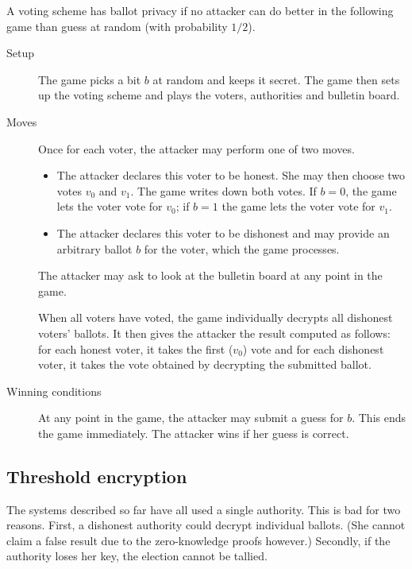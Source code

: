 \documentclass{llncs}
\begin{document}
\begin{definition}
A voting scheme has ballot privacy if no attacker can do better in the following
game than guess at random (with probability $1/2$).

\begin{description}
\item[Setup] The game picks a bit $b$ at random and keeps it secret. The game
then sets up the voting scheme and plays the voters, authorities and bulletin
board.

\item[Moves] Once for each voter, the attacker may perform one of two moves.
\begin{itemize}
\item The attacker declares this voter to be honest. She may then choose two votes $v_0$ and
$v_1$. The game writes down both votes. If $b = 0$, the game lets the voter vote
for $v_0$; if $b = 1$ the game lets the voter vote for $v_1$.

\item The attacker declares this voter to be dishonest and may provide an
arbitrary ballot $b$ for the voter, which the game processes.
\end{itemize}

The attacker may ask to look at the bulletin board at any point in the game.

When all voters have voted, the game individually decrypts all dishonest voters' ballots. It then gives the attacker the result computed as follows:
for each honest voter, it takes the first ($v_0$) vote and for each dishonest
voter, it takes the vote obtained by decrypting the submitted ballot.

\item[Winning conditions]
At any point in the game, the attacker may submit a guess for $b$. This ends the
game immediately. The attacker wins if her guess is correct.
\end{description}
\end{definition}


\subsection{Threshold encryption}

The systems described so far have all used a single authority. This is bad for
two reasons. First, a dishonest authority could decrypt individual ballots. (She
cannot claim a false result due to the zero-knowledge proofs however.) Secondly,
if the authority loses her key, the election cannot be tallied.
\end{document}
